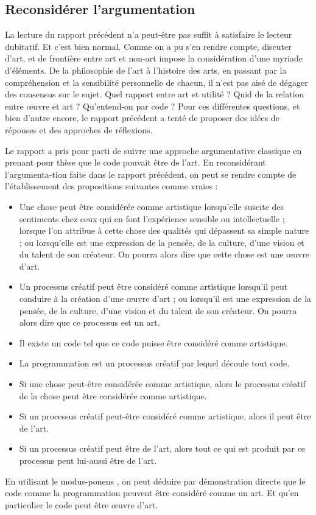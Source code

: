 \documentclass[12pt]{article} %
\begin{document}
\subsection{Reconsidérer l'argumentation}
La lecture du rapport précédent n'a peut-être pas suffit à satisfaire le lecteur dubitatif. Et c'est bien normal. Comme on a pu s'en rendre compte, discuter d'art, et de frontière entre art et non-art impose la considération d'une myriade d'éléments. De la philosophie de l'art à l'histoire des arts, en passant par la compréhension et la sensibilité personnelle de chacun, il n'est pas aisé de dégager des consensus sur le sujet. Quel rapport entre art et utilité ? Quid de la relation entre œuvre et art ? Qu'entend-on par code ? Pour ces différentes questions, et bien d'autre encore, le rapport précédent a tenté de proposer des idées de réponses et des approches de réflexions.

Le rapport a pris pour parti de suivre une approche argumentative classique en prenant pour thèse que le code pouvait être de l'art. En reconsidérant l'argumenta\hyp{}tion faite dans le rapport précédent, on peut se rendre compte de l'établissement des propositions suivantes comme vraies :
\begin{itemize}
    \item Une chose peut être considérée comme artistique lorsqu'elle suscite des sentiments chez ceux qui en font l'expérience sensible ou intellectuelle ; lorsque l'on attribue à cette chose des qualités qui dépassent sa simple nature ; ou lorsqu'elle est une expression de la pensée, de la culture, d'une vision et du talent de son créateur. On pourra alors dire que cette chose est une œuvre d'art.
    \item Un processus créatif peut être considéré comme artistique lorsqu'il peut conduire à la création d'une œuvre d'art ; ou lorsqu'il est une expression de la pensée, de la culture, d'une vision et du talent de son créateur. On pourra alors dire que ce processus est un art.
    \item Il existe un code tel que ce code puisse être considéré comme artistique. 
    \item La programmation est un processus créatif par lequel découle tout code.
    \item Si une chose peut-être considérée comme artistique, alors le processus créatif de la chose peut être considérée comme artistique.
    \item Si un processus créatif peut-être considéré comme artistique, alors il peut être de l'art.
    \item Si un processus créatif peut être de l'art, alors tout ce qui est produit par ce processus peut lui-aussi être de l'art.
\end{itemize}
En utilisant le \gls{modus-ponens} \cite{SCalabretto-ALIA}, on peut déduire par démonstration directe que le code comme la programmation peuvent être considéré comme un art. Et qu'en particulier le code peut être œuvre d'art. 
\end{document}

